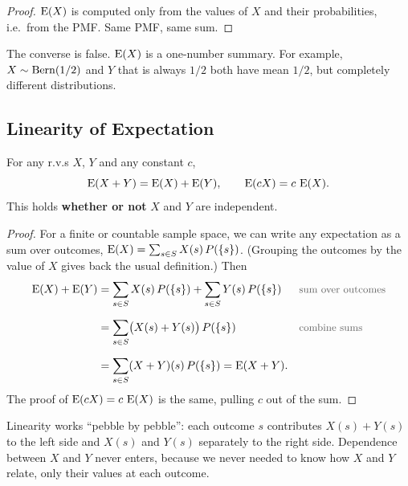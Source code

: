 \medskip

\begin{proof}
$\operatorname{E}(X)$ is computed only from the values of $X$ and their probabilities, i.e.\ from the PMF. Same PMF, same sum.
\end{proof}

\bigskip

\begin{pitfall}
The converse is false. $\operatorname{E}(X)$ is a one-number summary. For example, $X \sim \operatorname{Bern}(1/2)$ and $Y$ that is always $1/2$ both have mean $1/2$, but completely different distributions.
\end{pitfall}

\bigskip

\subsection{Linearity of Expectation}

\bigskip

\begin{theorem}\label{thm:linearity}
For any r.v.s $X$, $Y$ and any constant $c$,
\medskip
\[
\operatorname{E}(X + Y) = \operatorname{E}(X) + \operatorname{E}(Y),
\qquad
\operatorname{E}(cX) = c\,\operatorname{E}(X).
\]
\medskip
This holds \textbf{whether or not} $X$ and $Y$ are independent.
\end{theorem}

\medskip

\begin{proof}
For a finite or countable sample space, we can write any expectation as a sum over outcomes, $\operatorname{E}(X) = \sum_{s \in S} X(s)\,P(\{s\})$. (Grouping the outcomes by the value of $X$ gives back the usual definition.) Then
\medskip
\begin{align*}
\E(X) + \E(Y)
  &= \sum_{s \in S} X(s)\,P(\{s\}) + \sum_{s \in S} Y(s)\,P(\{s\})
  && \by{sum over outcomes} \\[0.6em]
  &= \sum_{s \in S} \bigl(X(s) + Y(s)\bigr)\,P(\{s\})
  && \by{combine sums} \\[0.6em]
  &= \sum_{s \in S} (X + Y)(s)\,P(\{s\})
   = \E(X + Y).
\end{align*}
\medskip
The proof of $\operatorname{E}(cX) = c\,\operatorname{E}(X)$ is the same, pulling $c$ out of the sum.
\end{proof}

\bigskip

\begin{intuition}
Linearity works ``pebble by pebble'': each outcome $s$ contributes $X(s) + Y(s)$ to the left side and $X(s)$ and $Y(s)$ separately to the right side. Dependence between $X$ and $Y$ never enters, because we never needed to know how $X$ and $Y$ relate, only their values at each outcome.
\end{intuition}

